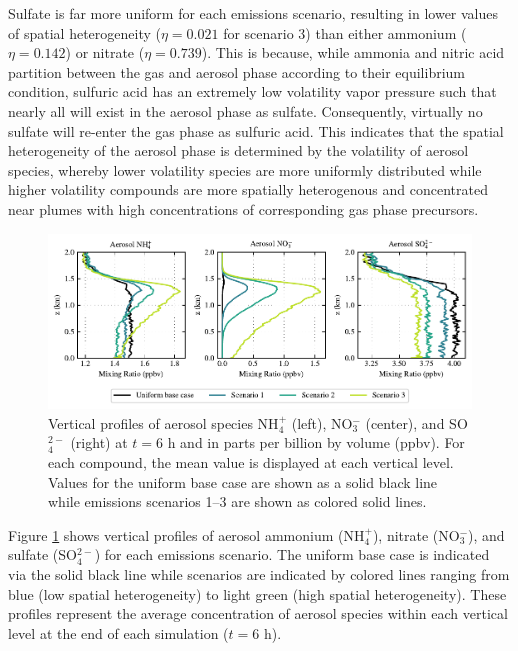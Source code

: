 \documentclass[journal abbreviation, manuscript]{copernicus}
\begin{document}
Sulfate is far more uniform for each emissions scenario, resulting in lower values of spatial heterogeneity ($\eta=0.021$ for scenario 3) than either ammonium ($\eta = 0.142$) or nitrate ($\eta=0.739$).  This is because, while ammonia and nitric acid partition between the gas and aerosol phase according to their equilibrium condition, sulfuric acid has an extremely low volatility vapor pressure such that nearly all will exist in the aerosol phase as sulfate. Consequently, virtually no sulfate will re-enter the gas phase as sulfuric acid. This indicates that the spatial heterogeneity of the aerosol phase is determined by the volatility of aerosol species, whereby lower volatility species are more uniformly distributed while higher volatility compounds are more spatially heterogenous and concentrated near plumes with high concentrations of corresponding gas phase precursors.    


\begin{figure}[!h]
	\centering
	\includegraphics[]{figures/aerosol-SNA-vertical-profiles-time36.pdf}
	\caption{Vertical profiles of aerosol species NH$_4^+$ (left), NO$_3^-$ (center), and SO$_4^{2-}$ (right) at $t=6$ h and in parts per billion by volume (ppbv). For each compound, the mean value is displayed at each vertical level. Values for the uniform base case are shown as a solid black line while emissions scenarios 1--3 are shown as colored solid lines.}
	\label{fig:vertical-profile-SNA}
\end{figure} 

Figure \ref{fig:vertical-profile-SNA} shows vertical profiles of aerosol ammonium (NH$_4^+$), nitrate (NO$_3^-$), and sulfate (SO$_4^{2-}$) for each emissions scenario. The uniform base case is indicated via the solid black line while scenarios are indicated by colored lines ranging from blue (low spatial heterogeneity) to light green (high spatial heterogeneity). These profiles represent the average concentration of aerosol species within each vertical level at the end of each simulation ($t=6$ h). 
\end{document}
